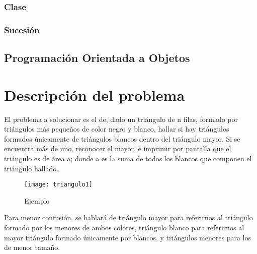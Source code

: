 \documentclass[letterpaper]{article}
\begin{document}
  \subsubsection{Clase}
  \subsubsection{Sucesi\'on}
  \subsection{Programaci\'on Orientada a Objetos}
  \newpage
  \section{Descripci\'on del problema}

  \par
  El problema a solucionar es el de, dado un tri\'angulo de n filas,
  formado por tri\'angulos m\'as peque\~nos de color negro y blanco, hallar si hay
  tri\'angulos formados \'unicamente de tri\'angulos blancos dentro del tri\'angulo
  mayor. Si se encuentra m\'as de uno, reconocer el mayor, e imprimir por pantalla
  que el tri\'angulo es de \'area a; donde a es la suma de todos los blancos que
  componen el tri\'angulo hallado.\par

    \begin{figure}[h!]
      \centering
      \texttt{[image: triangulo1]}
      \caption{Ejemplo}
    \end{figure}

  Para menor confusi\'on, se hablar\'a de tri\'angulo mayor para
  referirnos al tri\'angulo formado por los menores de ambos colores, tri\'angulo
  blanco para referirnos al mayor tri\'angulo formado \'unicamente por blancos, y
  tri\'angulos menores para los de menor tama\~no.\par
\end{document}
